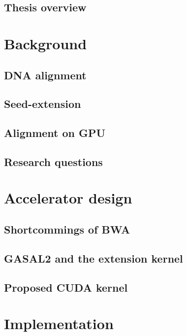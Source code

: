 \documentclass[11pt,twoside]{ce}
\begin{document}
\section{Thesis overview}


\chapter{Background}
\label{chap:background}
\section{DNA alignment}


\section{Seed-extension}


\section{Alignment on GPU}


\section{Research questions}


\chapter{Accelerator design}
\label{chap:accel}


\section{Shortcommings of BWA}

\section{GASAL2 and the extension kernel}
	

\section{Proposed CUDA kernel}


\chapter{Implementation}
\label{chap:implementation}

\end{document}
